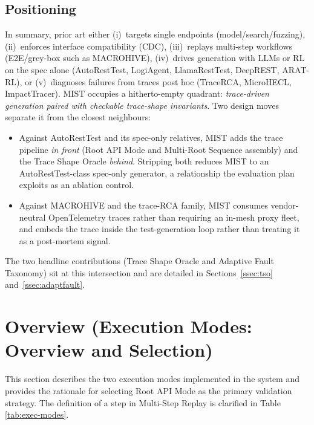 \documentclass[conference]{IEEEtran}
\begin{document}
\subsection{Positioning}
In summary, prior art either (i)~targets single endpoints (model/search/fuzzing), (ii)~enforces interface compatibility (CDC), (iii)~replays multi-step workflows (E2E/grey-box such as MACROHIVE), (iv)~drives generation with LLMs or RL on the spec alone (AutoRestTest, LogiAgent, LlamaRestTest, DeepREST, ARAT-RL), or (v)~diagnoses failures from traces post hoc (TraceRCA, MicroHECL, ImpactTracer).  \textsc{MIST} occupies a hitherto-empty quadrant: \emph{trace-driven generation paired with checkable trace-shape invariants}.  Two design moves separate it from the closest neighbours:

\begin{itemize}[leftmargin=*]
  \item Against AutoRestTest and its spec-only relatives, \textsc{MIST}
        adds the trace pipeline \emph{in front} (Root API Mode and
        Multi-Root Sequence assembly) and the Trace Shape Oracle
        \emph{behind}.  Stripping both reduces \textsc{MIST} to an
        AutoRestTest-class spec-only generator, a relationship the
        evaluation plan exploits as an ablation control.
  \item Against MACROHIVE and the trace-RCA family, \textsc{MIST}
        consumes vendor-neutral OpenTelemetry traces rather than
        requiring an in-mesh proxy fleet, and embeds the trace inside
        the test-generation loop rather than treating it as a
        post-mortem signal.
\end{itemize}

The two headline contributions (Trace Shape Oracle and Adaptive Fault
Taxonomy) sit at this intersection and are detailed in
Sections~\ref{ssec:tso} and~\ref{ssec:adaptfault}.

\section{Overview (Execution Modes: Overview and Selection)}\label{sec:overview}
This section describes the two execution modes implemented in the system and provides the rationale for selecting Root API Mode as the primary validation strategy. The definition of a step in Multi-Step Replay is clarified in Table \ref{tab:exec-modes}.
\end{document}
